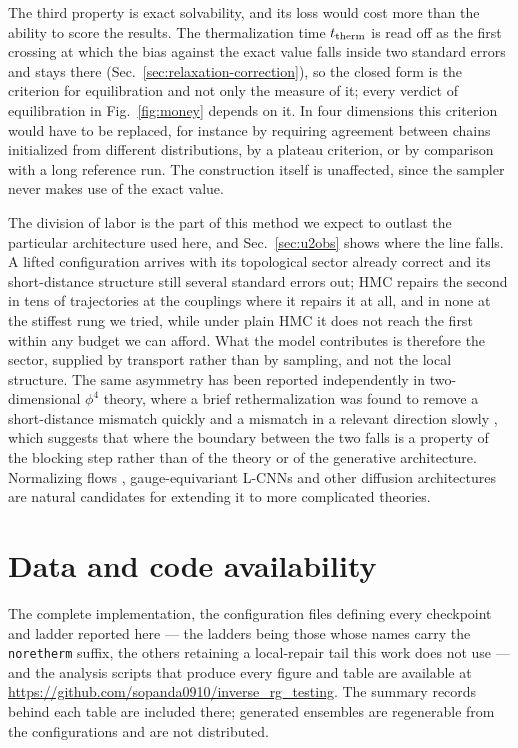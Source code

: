 \documentclass[prd, twocolumn, superscriptaddress, nofootinbib,floatfix]{revtex4-2}
\DeclareRobustCommand{\fig}[1]{Fig.~\ref{fig:#1}}
\DeclareRobustCommand{\sect}[1]{Sec.~\ref{sec:#1}}
\begin{document}
The third property is exact solvability, and its loss would cost more than the
ability to score the results. The thermalization time $t_{\rm therm}$ is read
off as the first crossing at which the bias against the exact value falls inside
two standard errors and stays there (\sect{relaxation-correction}), so the
closed form is the criterion for equilibration and not only the measure of it;
every verdict of equilibration in \fig{money} depends on it. In four dimensions this
criterion would have to be replaced, for instance by requiring agreement between
chains initialized from different distributions, by a plateau criterion, or by
comparison with a long reference run. The construction itself is unaffected,
since the sampler never makes use of the exact value.

The division of labor is the part of this method we expect to outlast the
particular architecture used here, and \sect{u2obs} shows where the line falls.
A lifted configuration arrives with its topological sector already correct and
its short-distance structure still several standard errors out; HMC repairs the
second in tens of trajectories at the couplings where it repairs it at all, and
in none at the stiffest rung we tried, while under plain HMC it does not reach
the first within any budget we can afford. What the model contributes is therefore the sector, supplied by
transport rather than by sampling, and not the local structure. The same asymmetry has been
reported independently in two-dimensional $\phi^4$ theory, where a brief
rethermalization was found to remove a short-distance mismatch quickly and a
mismatch in a relevant direction slowly \cite{hasenfratz2026}, which suggests
that where the boundary between the two falls is a property of the blocking step
rather than of the theory or of the generative architecture. Normalizing flows
\cite{albergo2019,hasenfratz2026cascade}, gauge-equivariant L-CNNs
\cite{favoni2020} and other diffusion architectures
\cite{zhu2024,zhu2025,aarts2026,komijani2026} are natural candidates
for extending it to more complicated theories.

\section*{Data and code availability}
The complete implementation, the configuration files defining every checkpoint
and ladder reported here --- the ladders being those whose names carry the
\texttt{noretherm} suffix, the others retaining a local-repair tail this work
does not use --- and the analysis scripts that produce every figure and
table are available at
\url{https://github.com/sopanda0910/inverse_rg_testing}. The summary records
behind each table are included there; generated ensembles are regenerable from
the configurations and are not distributed.
\end{document}

